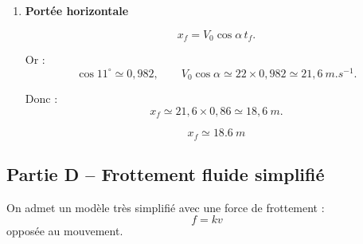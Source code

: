 \documentclass[11pt,a4paper]{article}
\begin{document}
\begin{enumerate}[label=\textbf{3.\arabic*}, resume, leftmargin=1.6em]
On suppose ici que le skieur retombe à la même altitude que le point d’envol.

Il faut résoudre :
\[
z(t)=0
\]
avec \(t\neq 0\), soit :
\[
V_0\sin\alpha\, t-\frac12 gt^2=0.
\]

Donc :
\[
t_f=\frac{2V_0\sin\alpha}{g}.
\]

Numériquement :
\[
t_f=\frac{2\times 4{,}20}{9{,}81}\simeq 0{,}86\ \si{s}.
\]

\[
\boxed{t_f\simeq \SI{0,86}{s}}
\]

\item \textbf{Portée horizontale}

\[
x_f=V_0\cos\alpha\, t_f.
\]

Or :
\[
\cos 11^\circ \simeq 0{,}982,
\qquad
V_0\cos\alpha \simeq 22\times 0{,}982 \simeq 21{,}6\ \si{m.s^{-1}}.
\]

Donc :
\[
x_f\simeq 21{,}6\times 0{,}86 \simeq 18{,}6\ \si{m}.
\]

\[
\boxed{x_f\simeq \SI{18,6}{m}}
\]

\end{enumerate}

\subsection*{Partie D -- Frottement fluide simplifié}

On admet un modèle très simplifié avec une force de frottement :
\[
f=kv
\]
opposée au mouvement.
\end{document}
